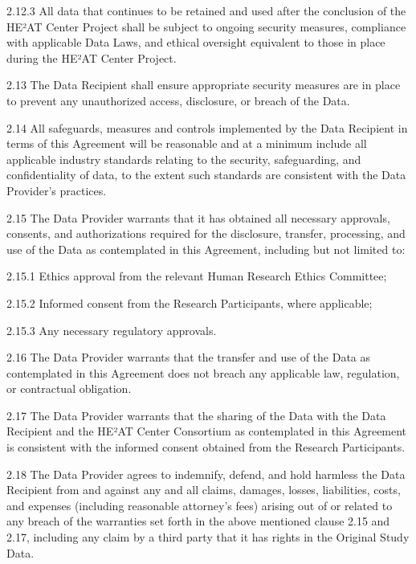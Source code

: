 \documentclass[12pt,letterpaper]{article}
\newcommand{\added}[1]{\textcolor{addcolor}{#1}}
\begin{document}
\added{2.12.3 All data that continues to be retained and used after the conclusion of the HE²AT Center Project shall be subject to ongoing security measures, compliance with applicable Data Laws, and ethical oversight equivalent to those in place during the HE²AT Center Project.}

2.13 The Data Recipient shall ensure appropriate security measures are in place to prevent any unauthorized access, disclosure, or breach of the Data.

2.14 All safeguards, measures and controls implemented by the Data Recipient in terms of this Agreement will be reasonable and at a minimum include all applicable industry standards relating to the security, safeguarding, and confidentiality of data, to the extent such standards are consistent with the Data Provider's practices.

2.15 The Data Provider warrants that it has obtained all necessary approvals, consents, and authorizations required for the disclosure, transfer, processing, and use of the Data as contemplated in this Agreement, including but not limited to:

2.15.1 Ethics approval from the relevant Human Research Ethics Committee;

2.15.2 Informed consent from the Research Participants, where applicable;

2.15.3 Any necessary regulatory approvals.

2.16 The Data Provider warrants that the transfer and use of the Data as contemplated in this Agreement does not breach any applicable law, regulation, or contractual obligation.

2.17 The Data Provider warrants that the sharing of the Data with the Data Recipient and the HE²AT Center Consortium as contemplated in this Agreement is consistent with the informed consent obtained from the Research Participants.

2.18 The Data Provider agrees to indemnify, defend, and hold harmless the Data Recipient from and against any and all claims, damages, losses, liabilities, costs, and expenses (including reasonable attorney's fees) arising out of or related to any breach of the warranties set forth in the above mentioned clause 2.15 and 2.17, including any claim by a third party that it has rights in the Original Study Data.
\end{document}
